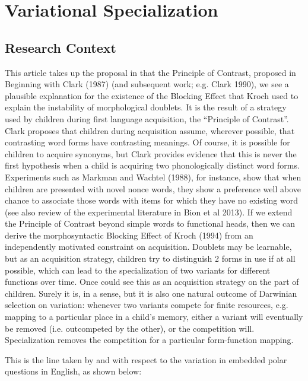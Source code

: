 \documentclass{artikel3}
\begin{document}
\section{Variational Specialization}

\subsection{Research Context}


This article takes up the proposal in \citet{fruehwaldwallenberginprep} that the Principle of Contrast, proposed in  Beginning with Clark (1987) (and subsequent work; e.g. Clark 1990), we see a plausible explanation for the existence of the Blocking Effect that Kroch used to explain the instability of morphological doublets. It is the result of a strategy used by children during first language acquisition, the “Principle of Contrast”. Clark proposes that children during acquisition assume, wherever possible, that contrasting word forms have contrasting meanings. Of course, it is possible for children to acquire synonyms, but Clark provides evidence that this is never the first hypothesis when a child is acquiring two phonologically distinct word forms. Experiments such as Markman and Wachtel (1988), for instance, show that when children are presented with novel nonce words, they show a preference well above chance to associate those words with items for which they have no existing word (see also review of the experimental literature in Bion et al 2013). If we extend the Principle of Contrast beyond simple words to functional heads, then we can derive the morphosyntactic Blocking Effect of Kroch (1994) from an independently motivated constraint on acquisition. Doublets may be learnable, but as an acquisition strategy, children try to distinguish 2 forms in use if at all possible, which can lead to the specialization of two variants for different functions over time. Once could see this as an acquisition strategy on the part of children. Surely it is, in a sense, but it is also one natural outcome of Darwinian selection on variation: whenever two variants compete for finite resources, e.g. mapping to a particular place in a child's memory, either a variant will eventually be removed (i.e. outcompeted by the other), or the competition will. Specialization removes the competition for a particular form-function mapping.

This is the line taken by \citet{baileywallenbergwurff2012} and \citet{fruehwaldwallenberg2013} with respect to the variation in embedded polar questions in English, as shown below:
\end{document}
